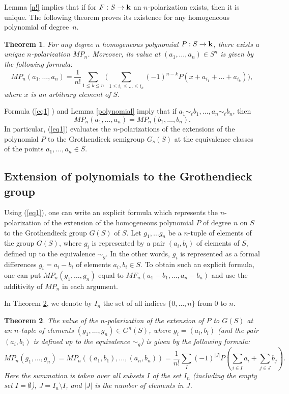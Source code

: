 \documentclass[11pt]{article}
\theoremstyle{plain}
\newtheorem{theorem}{Theorem}[section]
\theoremstyle{definition}
\begin{document}
Lemma \ref{n!} implies that if for $F:S\to \bold k$ an $n$-polarization
exists, then it is unique. The following theorem proves its existence for
any homogeneous polynomial of degree~$n$.

  \begin{theorem}
For any  degree $n$  homogeneous polynomial $P:S\to \bold k$, there
exists a unique $n$-polarization $MP_n$. Moreover, its value  at
$(a_1,\dots,a_n)\in S^n$ is given by the following formula:
\begin{equation}\label{eq1} MP_n(a_1,\dots, a_n)=\frac{1}{n!} \sum
_{1\leq k\leq n} \Bigg( \sum _{1\leq i_1\leq \dots \leq  i_k} (-1)^{n-k}
P(x+a_{i_1}+\dots+a_{i_k})\Bigg),
\end{equation}
where $x$ is an arbitrary element of $S$.
\end{theorem}

Formula (\ref{eq1} ) and Lemma \ref{polynomial}  imply that if
$a_1\sim_t b_1,\dots, a_n\sim_t b_n$, then
\begin{equation*}MP_n(a_1,\dots,a_n)=MP_n (b_1,\dots,b_n).\end{equation*}
  In particular, (\ref{eq1}) evaluates the  $n$-polarizations of the
extensions of the polynomial $P$ to the Grothendieck semigroup  $G_s(S)$
at the equivalence classes of the  points $a_1,\dots, a_n\in S$.

\subsection{Extension of  polynomials to the  Grothendieck group}\label{subsec2.4}

Using (\ref{eq1}), one can write  an explicit  formula  which
represents  the $n$-polarization of the extension of the homogeneous
polynomial  $P$ of degree $n$ on $S$ to the Grothendieck group $G(S)$ of
$S$. Let
$g_1,\dots g_n$ be
a  $n$-tuple of elements of the group $G(S)$, where $g_i$ is represented
by a pair $(a_i,b_i)$ of elements of $S$, defined up to the equivalence
$\sim_g$. In the other words, $g_i$ is represented as a formal
differences $g_i=a_i-b_i$ of elements $a_i,b_i\in S$.
To obtain such an explicit  formula, one can put  $MP_n(g_1,\dots,g_n)$ equal to
$MF_n(a_1-b_1,\dots, a_n-b_n)$ and use the  additivity of $MP_n$ in
each argument.

In Theorem \ref{maint}, we denote by  $I_n$  the set of all indices
$\{0,\dots,n\}$   from $0$ to $n$.

\begin{theorem}\label{maint} The value of the  $n$-polarization of the
extension of  $P$ to $G(S)$ at  an $n$-tuple of elements $(g_1,\dots,
g_n)\in G^n(S)$, where  $g_i=(a_i,b_i)$ (and the pair $(a_i,b_i)$ is
defined up to the equivalence $\sim_g$)  is given by the following
formula:
\begin{equation}\label{maine}
MP_n(g_1,\dots,g_n)=MP_n((a_1,b_1),\dots, (a_n,b_n))=\frac{1}{n!}
\sum_{I} (-1)^{|J|} P(\sum_{i\in I } a_i +\sum _{j\in J} b_j).
\end{equation}
Here the summation is taken over all subsets $I$ of the set $I_n$
(including the empty set $I =\emptyset$), $J=I_n\setminus I$,  and $|J|$
is the number of elements in $J$.
\end{theorem}
\end{document}
